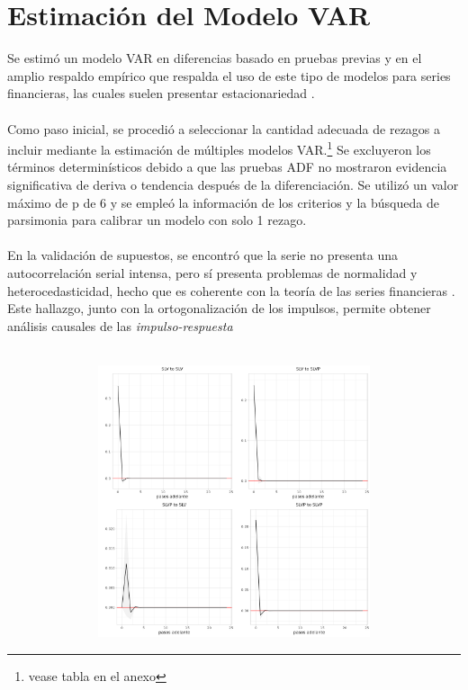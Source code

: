 \documentclass[11pt]{article}
\begin{document}
\section{Estimación del Modelo VAR}
\begin{flushleft}
    Se estimó un modelo VAR en diferencias basado en pruebas previas y en el amplio respaldo empírico que respalda el uso de este tipo de modelos para series financieras, las cuales suelen presentar estacionariedad \citep{Tsay_2005}.\\~\\
    Como paso inicial, se procedió a seleccionar la cantidad adecuada de rezagos a incluir mediante la estimación de múltiples modelos VAR.\footnote{vease tabla en el anexo} Se excluyeron los términos determinísticos debido a que las pruebas ADF no mostraron evidencia significativa de deriva o tendencia después de la diferenciación. Se utilizó un valor máximo de p de 6 y se empleó la información de los criterios y la búsqueda de parsimonia para calibrar un modelo con solo 1 rezago.\\~\\
    En la validación de supuestos, se encontró que la serie no presenta una autocorrelación serial intensa, pero sí presenta problemas de normalidad y heterocedasticidad, hecho que es coherente con la teoría de las series financieras \citep{Calderon}. Este hallazgo, junto con la ortogonalización de los impulsos, permite obtener análisis causales de las \textit{impulso-respuesta}\\~\\

    \begin{center}
    \begin{figure}[!ht]
      \centering
      \includegraphics[width=15cm, height=8cm]{Imagenes/impulso_respuesta.png}
      \vspace{0cm}
    \end{figure}
  \end{center}


\end{flushleft}
\end{document}
